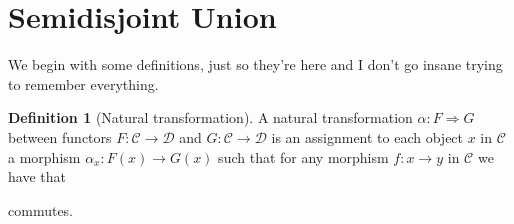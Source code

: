 \documentclass[reqno,dvipsnames]{amsart}
\let\mc\mathcal
\renewcommand{\a}{\alpha}
\renewcommand{\phi}{\varphi}
\newcommand{\Inn}{\text{Inn}}
\newcommand{\pInn}{\widehat{\text{Inn}}}
\theoremstyle{definition}
\newtheorem{definition}[theorem]{Definition}
\begin{document}
{

\section{Semidisjoint Union}

We begin with some definitions, just so they're here and I don't go insane trying to remember everything.

\begin{definition}[Natural transformation]
A natural transformation $\a:F\Rightarrow G$ between functors $F:\mc{C}\to\mc{D}$ and $G:\mc{C}\to\mc{D}$ is an assignment to each object $x$ in $\mc{C}$ a morphism $\a_x:F(x)\to G(x)$ such that for any morphism $f:x\to y$ in $\mc{C}$ we have that
\begin{center}
\end{center}
commutes.


\end{definition}}
\end{document}
